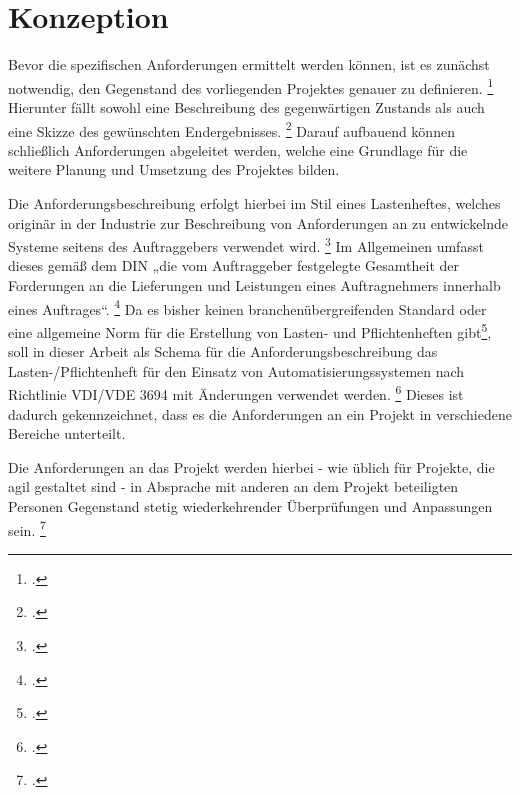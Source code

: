 \chapter{Konzeption}
Bevor die spezifischen Anforderungen ermittelt werden können, ist es zunächst notwendig,
den Gegenstand des vorliegenden Projektes genauer zu definieren.
\footcite[Vgl.][S. 270 ff.]{schuesslerEinfuehrungDokumentenManagementSystemsFuer2008}
Hierunter fällt sowohl eine Beschreibung des gegenwärtigen Zustands als auch eine Skizze des gewünschten Endergebnisses.
\footcite[Vgl.][39]{braatzEntwicklungMethodeZur2005a}
Darauf aufbauend können schließlich Anforderungen abgeleitet werden, welche eine Grundlage für die weitere Planung und Umsetzung des Projektes bilden.

Die Anforderungsbeschreibung erfolgt hierbei im Stil eines Lastenheftes, welches originär in der Industrie zur Beschreibung von Anforderungen
an zu entwickelnde Systeme seitens des Auftraggebers verwendet wird.
\footcites[Vgl.][60]{gilzRequirementsEngineeringUnd2014}[][1]{houdekRequirementsEngineeringErfahrungen2003}[][483]{lauberWieFormalSoll1981}
Im Allgemeinen umfasst dieses gemäß dem \ac{DIN} „die vom Auftraggeber festgelegte Gesamtheit der Forderungen an die Lieferungen und Leistungen eines Auftragnehmers
innerhalb eines Auftrages“.
\footcite[Vgl.][13]{baerBegriffsbestimmungenUndDefinitionen2017}
Da es bisher keinen branchenübergreifenden Standard oder eine allgemeine Norm für die
Erstellung von Lasten- und Pflichtenheften gibt\footcite[Vgl.][219]{goehlichArbeitenMitAnforderungen2021},
soll in dieser Arbeit als Schema für die Anforderungsbeschreibung das Lasten-/Pflichtenheft für den Einsatz von Automatisierungssystemen nach Richtlinie VDI/VDE 3694
mit Änderungen verwendet werden.
\footcite[Vgl.][S. 510 f.]{schellongEnergiemanagementsysteme2016}
Dieses ist dadurch gekennzeichnet, dass es die Anforderungen an ein Projekt in verschiedene Bereiche unterteilt.

Die Anforderungen an das Projekt werden hierbei - wie üblich für Projekte, die agil gestaltet sind -
in Absprache mit anderen an dem Projekt beteiligten Personen Gegenstand stetig wiederkehrender Überprüfungen und Anpassungen sein.
\footcites[Vgl.][1]{fazal-baqaieSkalierenGrossenAgilen2015}[94]{hruschkaAgileSoftwareentwicklungGrossen2009}[2]{gollMitScrumGewuenschten2015}[S. 72 f.]{hanschkeAgilePlanungNur2016}

